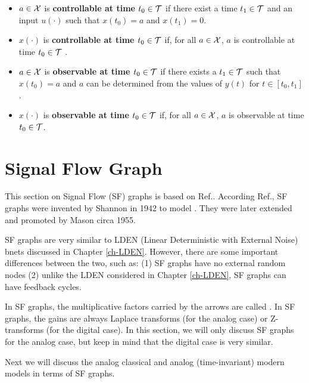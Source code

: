  \begin{itemize}
 \item
$a\in{\cal X}$ is {\bf controllable
at time $t_0\in{\cal T}$
}
if there exist a time
$t_1\in{\cal T}$ and an input $u(\cdot)$ such that $x(t_0)=a$
and $x(t_1)=0$.
\item
$x(\cdot)$ is {\bf controllable 
at time $t_0\in{\cal T}$}
if, for all $a\in{\cal X}$, 
 $a$ is controllable 
at time $t_0\in{\cal T}$ .
\item
$a\in{\cal X}$ is {\bf observable at time $t_0\in{\cal T}$}
if there exists a $t_1\in {\cal T}$
such that 
$x(t_0)=a$
and $a$
can be determined from
the values of 
$y(t)$ for $t\in [t_0, t_1]$.
\item
$x(\cdot)$ is {\bf observable
at time $t_0\in{\cal T}$ } 
if,
for all $a\in {\cal X}$, $a$ is 
observable 
at time $t_0\in{\cal T}$.
\end{itemize}

\section{Signal Flow Graph}
This section on
Signal Flow (SF) 
graphs
is based on Ref.\cite{wiki-signal-flow}.
According Ref.\cite{wiki-signal-flow},
SF graphs were invented by Shannon
in 1942
to model .
They were later 
extended and promoted by Mason circa 1955.

SF graphs are 
very similar to
LDEN (Linear Deterministic
with External Noise) bnets discussed in
Chapter \ref{ch-LDEN}. However,
there are some important differences between
the two, such as: (1) SF graphs
have no external random nodes
(2)
unlike the LDEN considered in 
Chapter \ref{ch-LDEN},
SF graphs can have feedback cycles.

In SF graphs, the
multiplicative factors
carried by the arrows  are called 
. In SF graphs,
the gains are always 
Laplace transforms (for the analog case)
or Z-transforms (for the digital case).
In this section, 
we will only discuss SF graphs for the
analog case, but keep in mind that the digital
case is very similar.

Next we will discuss the
analog classical and analog (time-invariant) modern
models in terms of SF graphs.

